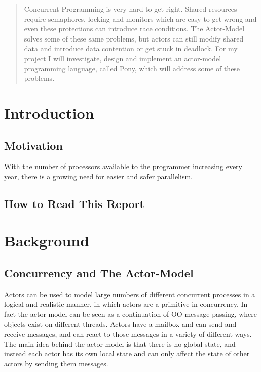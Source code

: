 \documentclass[pdftex,12pt,a4paper]{article}
\begin{document}
\setcounter{tocdepth}{2}
\tableofcontents

\newpage
\begin{abstract}

Concurrent Programming is very hard to get right.
Shared resources require semaphores, locking and monitors which are easy to get wrong and even these protections can introduce race conditions.
The Actor-Model solves some of these same problems, but actors can still modify shared data and introduce data contention or get stuck in deadlock.
For my project I will investigate, design and implement an actor-model programming language, called Pony, which will address some of these problems.
\end{abstract}

\section{Introduction}
\subsection{Motivation}

With the number of processors available to the programmer increasing every year\cite{freelunch}, there is a growing need for easier and safer parallelism.


\subsection{How to Read This Report}

\newpage
\section{Background}

\subsection{Concurrency and The Actor-Model}

Actors can be used to model large numbers of different concurrent processes in a logical and realistic manner, in which actors are a primitive in concurrency.
In fact the actor-model can be seen as a continuation of OO message-passing, where objects exist on different threads.
Actors have a mailbox and can send and receive messages, and can react to those messages in a variety of different ways.
The main idea behind the actor-model is that there is no global state, and instead each actor has its own local state and can only affect the state of other actors by sending them messages.
\end{document}
